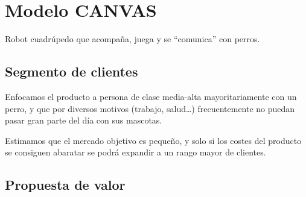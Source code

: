 \section{Modelo CANVAS}

Robot cuadrúpedo que acompaña, juega y se ``comunica'' con perros.

\begin{figure}[H]
    \centering
\end{figure}

\subsection{Segmento de clientes}


Enfocamos el producto a persona de clase media-alta mayoritariamente con un perro, y que por diversos motivos (trabajo, salud\dots) frecuentemente no puedan pasar gran parte del día con sus mascotas.

Estimamos que el mercado objetivo es pequeño, y solo si los costes del producto se consiguen abaratar se podrá expandir a un rango mayor de clientes.

\subsection{Propuesta de valor}


